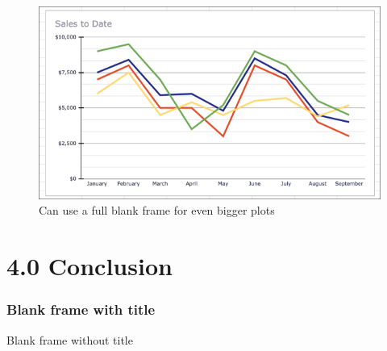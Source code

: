 \documentclass[t,compress,9pt,aspectratio=169]{beamer}
\begin{document}
\begin{frame}[plain]
  \begin{figure}[!htbp]
    \centering
    \caption{Can use a full blank frame for even bigger plots}
    \includegraphics[scale=.8]{figures/line_plot.png}
  \end{figure}
\end{frame}



\section{4.0 Conclusion}
\begin{frame}[fragile]
  \frametitle{Blank frame with title}
\end{frame}


\begin{frame}[fragile]
  \noframetitle[0mm]
    Blank frame without title
    \vskip 10mm
\end{frame}





\begin{frame}
  \vspace{0.5cm}\center{\Large{\textbf{\textcolor{nclblue}{References}}}}
  \vspace{0.25cm}
  \small
  
  
\end{frame}




\end{document}

